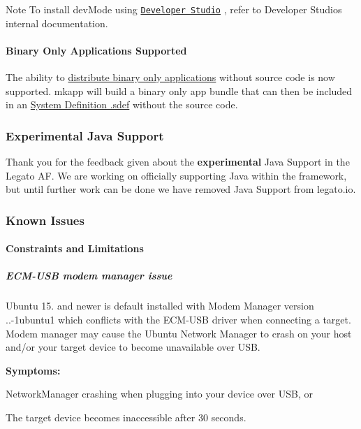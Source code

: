 \begin{DoxyNote}{Note}
To install {\ttfamily dev\+Mode} using \href{https://source.sierrawireless.com/resources/airprime/software/developer-studio-installinstructions}{\tt Developer Studio} , refer to Developer Studio\textquotesingle{}s internal documentation.
\end{DoxyNote}
\hypertarget{releaseNotes16104_rn16_10_4_binaryapps}{}\paragraph{Binary Only Applications Supported}\label{releaseNotes16104_rn16_10_4_binaryapps}
The ability to \hyperlink{buildToolsmkapp}{distribute binary only applications} without source code is now supported. {\ttfamily mkapp} will build a binary only app bundle that can then be included in an \hyperlink{defFilesSdef}{System Definition .sdef} without the source code.\hypertarget{releaseNotes16104_rn16_10_4_removeJava}{}\subsubsection{Experimental Java Support}\label{releaseNotes16104_rn16_10_4_removeJava}
Thank you for the feedback given about the {\bfseries experimental} Java Support in the Legato AF. We are working on officially supporting Java within the framework, but until further work can be done we have removed Java Support from legato.\+io.\hypertarget{releaseNotes16104_rn16_10_4_KnownIssues}{}\subsubsection{Known Issues}\label{releaseNotes16104_rn16_10_4_KnownIssues}
\hypertarget{releaseNotes16104_rn16_10_4_Constraints}{}\paragraph{Constraints and Limitations}\label{releaseNotes16104_rn16_10_4_Constraints}
\hypertarget{releaseNotes16104_rn16_10_4_ConstECMUSB}{}\subparagraph{E\+C\+M-\/\+U\+S\+B modem manager issue}\label{releaseNotes16104_rn16_10_4_ConstECMUSB}
Ubuntu 15. and newer is default installed with Modem Manager version {..-\/1ubuntu1} which conflicts with the E\+C\+M-\/\+U\+SB driver when connecting a target. Modem manager may cause the Ubuntu Network Manager to crash on your host and/or your target device to become unavailable over U\+SB.

{\bfseries Symptoms\+:} 
\begin{DoxyItemize}
\item Network\+Manager crashing when plugging into your device over U\+SB, or
\item The target device becomes inaccessible after 30 seconds.
\end{DoxyItemize}

